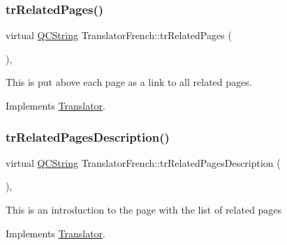 \mbox{\label{class_translator_french_a4e146a8d34fbf48ddfa01c7374950df2}} 
\subsubsection{\texorpdfstring{trRelatedPages()}{trRelatedPages()}}
{\footnotesize\ttfamily virtual \mbox{\hyperlink{class_q_c_string}{Q\+C\+String}} Translator\+French\+::tr\+Related\+Pages (\begin{DoxyParamCaption}{ }\end{DoxyParamCaption})\hspace{0.3cm}{\ttfamily [inline]}, {\ttfamily [virtual]}}

This is put above each page as a link to all related pages. 

Implements \mbox{\hyperlink{class_translator}{Translator}}.

\mbox{\label{class_translator_french_adbf5a2487b72bdf84150e36cabb30f0c}} 
\subsubsection{\texorpdfstring{trRelatedPagesDescription()}{trRelatedPagesDescription()}}
{\footnotesize\ttfamily virtual \mbox{\hyperlink{class_q_c_string}{Q\+C\+String}} Translator\+French\+::tr\+Related\+Pages\+Description (\begin{DoxyParamCaption}{ }\end{DoxyParamCaption})\hspace{0.3cm}{\ttfamily [inline]}, {\ttfamily [virtual]}}

This is an introduction to the page with the list of related pages 

Implements \mbox{\hyperlink{class_translator}{Translator}}.

\mbox{\label{class_translator_french_abb7bc2a17bea03a58c0a20926c625272}} 
